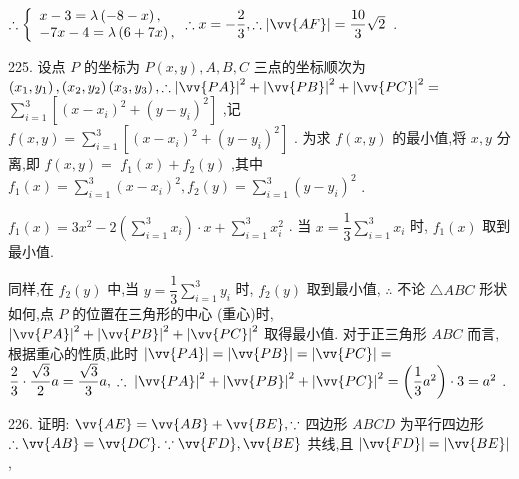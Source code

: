 $\therefore \left\{  {\begin{array}{l} x - 3 = \lambda \left( {-8 - x}\right) , \\   - {7x} - 4 = \lambda \left( {6 + {7x}}\right) , \end{array}\therefore x =  - \dfrac{2}{3},\therefore \left| \vv{AF}\right|  = \dfrac{10}{3}\sqrt{2}}\right.$ .

225. 设点 $P$ 的坐标为 $P\left( {x,y}\right) ,A,B,C$ 三点的坐标顺次为 $\left( {{x}_{1},{y}_{1}}\right) ,\left( {{x}_{2},{y}_{2}}\right) \left( {{x}_{3},{y}_{3}}\right) ,\therefore {\left| \vv{PA}\right| }^{2} + {\left| \vv{PB}\right| }^{2} + {\left| \vv{PC}\right| }^{2} =$  $\mathop{\sum }\limits_{{i = 1}}^{3}\left\lbrack  {{\left( x - {x}_{i}\right) }^{2} + {\left( y - {y}_{i}\right) }^{2}}\right\rbrack$ ,记 $f\left( {x,y}\right)  = \mathop{\sum }\limits_{{i = 1}}^{3}\left\lbrack  {{\left( x - {x}_{i}\right) }^{2} + {\left( y - {y}_{i}\right) }^{2}}\right\rbrack$ . 为求 $f\left( {x,y}\right)$ 的最小值,将 $x,y$ 分离,即 $f\left( {x,y}\right)  =$  ${f}_{1}\left( x\right)  + {f}_{2}\left( y\right)$ ,其中 ${f}_{1}\left( x\right)  = \mathop{\sum }\limits_{{i = 1}}^{3}{\left( x - {x}_{i}\right) }^{2},{f}_{2}\left( y\right)  = \mathop{\sum }\limits_{{i = 1}}^{3}{\left( y - {y}_{i}\right) }^{2}$ .

${f}_{1}\left( x\right)  = 3{x}^{2} - 2\left( {\mathop{\sum }\limits_{{i = 1}}^{3}{x}_{i}}\right)  \cdot  x + \mathop{\sum }\limits_{{i = 1}}^{3}{x}_{i}^{2}$ . 当 $x = \dfrac{1}{3}\mathop{\sum }\limits_{{i = 1}}^{3}{x}_{i}$ 时, ${f}_{1}\left( x\right)$ 取到最小值.

同样,在 ${f}_{2}\left( y\right)$ 中,当 $y = \dfrac{1}{3}\mathop{\sum }\limits_{{i = 1}}^{3}{y}_{i}$ 时, ${f}_{2}\left( y\right)$ 取到最小值, $\therefore$ 不论 $\bigtriangleup {ABC}$ 形状如何,点 $P$ 的位置在三角形的中心 (重心)时, ${\left| \vv{PA}\right| }^{2} + {\left| \vv{PB}\right| }^{2} + {\left| \vv{PC}\right| }^{2}$ 取得最小值. 对于正三角形 ${ABC}$ 而言,根据重心的性质,此时 $\left| \vv{PA}\right|  = \left| \vv{PB}\right|  = \left| \vv{PC}\right|  =$  $\dfrac{2}{3} \cdot  \dfrac{\sqrt{3}}{2}a = \dfrac{\sqrt{3}}{3}a,\;\therefore \;{\left| \vv{PA}\right| }^{2} + {\left| \vv{PB}\right| }^{2} + {\left| \vv{PC}\right| }^{2} = \left( {\dfrac{1}{3}{a}^{2}}\right)  \cdot  3 = {a}^{2}$ .

226. 证明: $\vv{AE} = \vv{AB} + \vv{BE},\because$ 四边形 ${ABCD}$ 为平行四边形 $\therefore \vv{AB} = \vv{DC}.\because \vv{FD},\vv{BE}$ 共线,且 $\left| \vv{FD}\right|  = \left| \vv{BE}\right|$ ,

